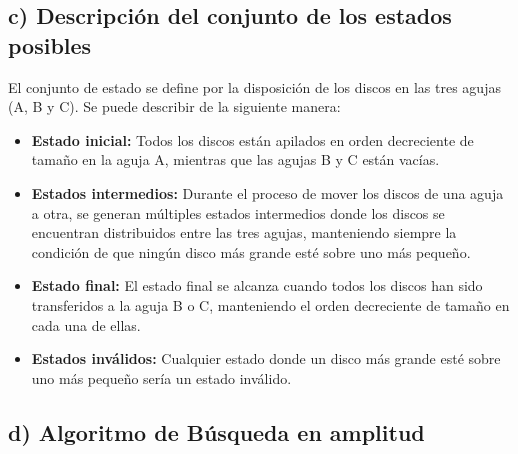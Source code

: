 \documentclass{article}
\begin{document}
\subsection*{c) Descripción del conjunto de los estados posibles}
El conjunto de estado se define por la disposición de los discos en las tres agujas (A, B y C). Se puede describir de la siguiente manera:
\begin{itemize}
    \item \textbf{Estado inicial:} Todos los discos están apilados en orden decreciente de tamaño en la aguja A, mientras que las agujas B y C están vacías.
    \item \textbf{Estados intermedios:} Durante el proceso de mover los discos de una aguja a otra, se generan múltiples estados intermedios donde los discos se encuentran distribuidos entre las tres agujas, manteniendo siempre la condición de que ningún disco más grande esté sobre uno más pequeño.
    \item \textbf{Estado final:} El estado final se alcanza cuando todos los discos han sido transferidos a la aguja B o C, manteniendo el orden decreciente de tamaño en cada una de ellas.
    \item \textbf{Estados inválidos:} Cualquier estado donde un disco más grande esté sobre uno más pequeño sería un estado inválido.
\end{itemize}

\subsection*{d) Algoritmo de Búsqueda en amplitud}
\end{document}
